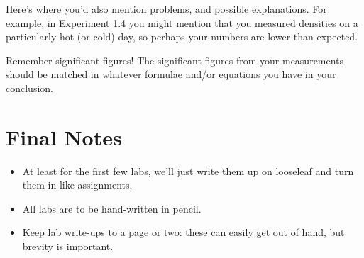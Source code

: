 \documentclass[12pt, oneside]{article}   	%
\begin{document}
Here's where you'd also mention problems, and possible explanations. For example, in Experiment 1.4 you might mention that you measured densities on a particularly hot (or cold) day, so perhaps your numbers are lower than expected.

Remember significant figures! The significant figures from your measurements should be matched in whatever formulae and/or equations you have in your conclusion. 

\section{Final Notes}
\begin{itemize}
\item At least for the first few labs, we'll just write them up on looseleaf and turn them in like assignments.
\item All labs are to be hand-written in pencil.
\item Keep lab write-ups to a page or two: these can easily get out of hand, but brevity is important.
\end{itemize}
\end{document}
